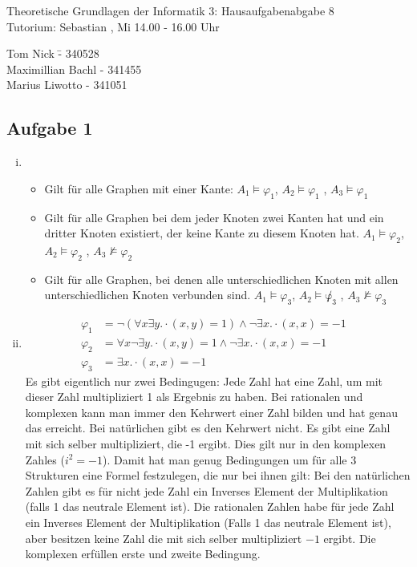 \documentclass[a4paper,10pt]{article}
\begin{document}
\begin{center}
\Large{Theoretische Grundlagen der Informatik 3: Hausaufgabenabgabe 8} \\
\large{Tutorium: Sebastian , Mi 14.00 - 16.00 Uhr}
\end{center}
\begin{tabbing}
Tom Nick \hspace{2cm}\= - 340528\\
Maximillian Bachl \> - 341455 \\
Marius Liwotto\> -  341051
\end{tabbing}
\subsection{Aufgabe 1}
\begin{enumerate}[(i)]
	\item 
	\begin{itemize}
		\item 	Gilt für alle Graphen mit einer Kante: $A_1 \vDash \varphi_1$, $A_2 \vDash \varphi_1$ , $A_3 \vDash \varphi_1$
		\item 	Gilt für alle Graphen bei dem jeder Knoten zwei Kanten hat und ein dritter Knoten existiert, der keine Kante zu diesem Knoten hat.
			$A_1 \vDash \varphi_2$, $A_2 \vDash \varphi_2$ , $A_3 \not\vDash \varphi_2$
		\item  	Gilt für alle Graphen, bei denen alle unterschiedlichen Knoten mit allen unterschiedlichen Knoten verbunden sind.
			$A_1 \vDash \varphi_3$, $A_2 \vDash \not\varphi_3$ , $A_3 \not\vDash \varphi_3$
	\end{itemize}
	\item 
	\begin{align*}
		\varphi_1 &= \lnot(\forall x \exists y. \cdot( x, y ) = 1) \land \lnot \exists x. \cdot(x,x) = -1 &\\
		\varphi_2 &= \forall x \lnot \exists y. \cdot( x, y ) = 1 \land \lnot \exists x. \cdot(x,x) = -1& \\
		\varphi_3 &= \exists x. \cdot(x,x) = -1&
	\end{align*}
	Es gibt eigentlich nur zwei Bedingugen: Jede Zahl hat eine Zahl, um mit dieser Zahl multipliziert 1 als Ergebnis zu haben. Bei rationalen und komplexen kann man immer den Kehrwert einer Zahl bilden und hat genau das erreicht. Bei natürlichen gibt es den Kehrwert nicht. Es gibt eine Zahl mit sich selber multipliziert, die -1 ergibt. Dies gilt nur in den komplexen Zahles ($i^2 = -1$). Damit hat man genug Bedingungen um für alle 3 Strukturen eine Formel festzulegen, die nur bei ihnen gilt: Bei den natürlichen Zahlen gibt es für nicht jede Zahl ein Inverses Element der Multiplikation (falls 1 das neutrale Element ist). Die rationalen Zahlen habe für jede Zahl ein Inverses Element der Multiplikation (Falls 1 das neutrale Element ist), aber besitzen keine Zahl die mit sich selber multipliziert $-1$ ergibt. Die komplexen erfüllen erste und zweite Bedingung.
	
\end{enumerate}
\end{document}
